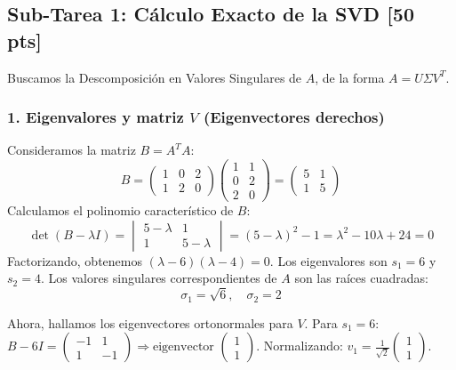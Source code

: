 \documentclass[12pt]{article}
\begin{document}
\newpage
\subsection*{Sub-Tarea 1: Cálculo Exacto de la SVD [50 pts]}
Buscamos la Descomposición en Valores Singulares de $A$, de la forma $A = U \Sigma V^T$.

\subsubsection*{1. Eigenvalores y matriz $V$ (Eigenvectores derechos)}
Consideramos la matriz $B = A^T A$:
\begin{equation}
    B = \begin{pmatrix} 1 & 0 & 2 \\ 1 & 2 & 0 \end{pmatrix} \begin{pmatrix} 1 & 1 \\ 0 & 2 \\ 2 & 0 \end{pmatrix} = \begin{pmatrix} 5 & 1 \\ 1 & 5 \end{pmatrix}
\end{equation}
Calculamos el polinomio característico de $B$:
\begin{equation}
    \det(B - \lambda I) = \begin{vmatrix} 5 - \lambda & 1 \\ 1 & 5 - \lambda \end{vmatrix} = (5 - \lambda)^2 - 1 = \lambda^2 - 10\lambda + 24 = 0
\end{equation}
Factorizando, obtenemos $(\lambda - 6)(\lambda - 4) = 0$.
Los eigenvalores son $s_1 = 6$ y $s_2 = 4$.
Los valores singulares correspondientes de $A$ son las raíces cuadradas:
\begin{equation}
    \sigma_1 = \sqrt{6}, \quad \sigma_2 = 2
\end{equation}

Ahora, hallamos los eigenvectores ortonormales para $V$.
Para $s_1 = 6$:
$B - 6I = \begin{pmatrix} -1 & 1 \\ 1 & -1 \end{pmatrix} \Rightarrow \text{eigenvector } \begin{pmatrix} 1 \\ 1 \end{pmatrix}$. Normalizando: $v_1 = \frac{1}{\sqrt{2}}\begin{pmatrix} 1 \\ 1 \end{pmatrix}$.
\end{document}
